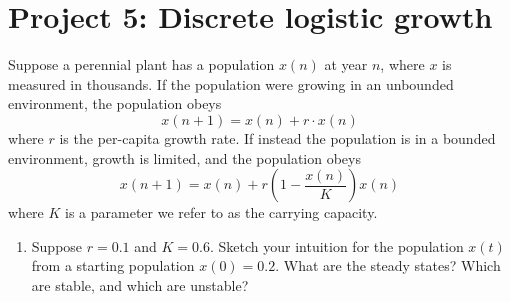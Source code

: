 \documentclass{exam}
\begin{document}
\section*{Project 5: Discrete logistic growth}
 
Suppose a perennial plant has a population $x(n)$ at year $n$, where $x$ is measured in thousands. If the population were growing in an unbounded environment, the population obeys
\begin{equation}
x(n+1) = x(n) + r \cdot x(n)
\end{equation} 
where $r$ is the per-capita growth rate. If instead the population is in a bounded environment, growth is limited, and the population obeys
\begin{equation}
x(n+1) = x(n) + r \left( 1- \frac{x(n)}{K}\right) x(n)
\end{equation} 
where $K$ is a parameter we refer to as the carrying capacity. 
\begin{enumerate}
\item Suppose $r=0.1$ and $K=0.6$.  Sketch your intuition for the population $x(t)$ from a starting population $x(0)=0.2$. What are the steady states? Which are stable, and which are unstable?
\end{enumerate}
\end{document}
